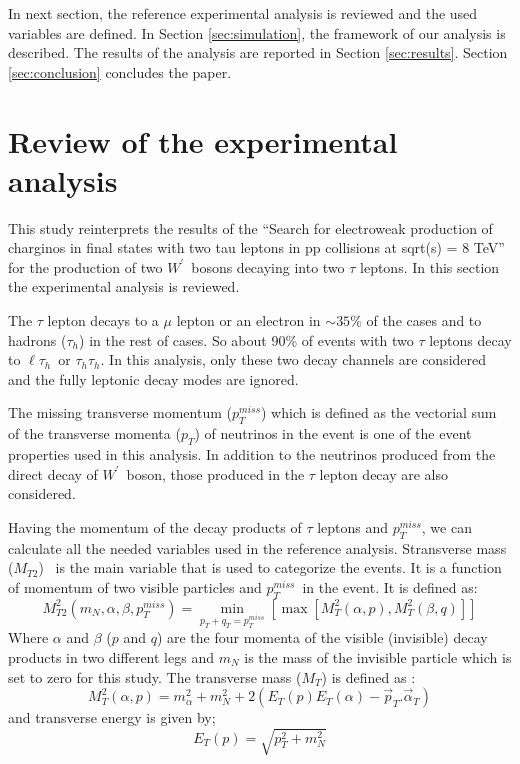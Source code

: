 \documentclass[preprint,showpacs,preprintnumbers]{revtex4}
\newcommand{\wprime}{\ensuremath{W^\prime}~}
\newcommand{\Tau}{\ensuremath{\tau_h}}
\newcommand{\tauTau}{\ensuremath{\tau_h\tau_h}}
\newcommand{\lepTau}{\ensuremath{\ell\tau_h}}
\newcommand{\pt}{\ensuremath{p_T}}
\newcommand{\MET}{\ensuremath{p_T^{miss}}}
\begin{document}
In next section, the reference experimental analysis is reviewed and the used variables are defined. In Section \ref{sec:simulation}, the framework of our analysis is described. The results of the analysis are reported in Section \ref{sec:results}. Section \ref{sec:conclusion} concludes the paper.

\section{Review of the experimental analysis}
This study reinterprets the results of the ``Search for electroweak production of charginos in final states with two tau leptons in pp collisions at sqrt(s) = 8 TeV''\cite{Khachatryan:2016trj} for the production of two \wprime bosons decaying into two $\tau$ leptons. In this section the experimental analysis is reviewed.

The $\tau$ lepton decays  to a $\mu$ lepton or an electron in $\sim 35\%$ of the cases and to hadrons (\Tau) in the rest of cases. So about 90\% of events with two $\tau$ leptons decay to \lepTau ~or \tauTau. In this analysis, only these two decay channels are considered and the fully leptonic decay modes are ignored. 

The missing transverse momentum (\MET) which is  defined as the vectorial sum of the transverse momenta (\pt) of neutrinos in the event is one of the event properties used in this analysis. In addition to the neutrinos  produced from the direct decay of \wprime boson, those produced in the $\tau$ lepton decay are also considered.

Having the momentum of the decay products of $\tau$ leptons and \MET, we can calculate all the needed variables used in the reference analysis. Stransverse mass ($M_{T2}$)~\cite{Lester:1999tx,Barr:2003rg}  is the main variable that is used to categorize the events. It is a function of momentum of two visible particles and \MET ~in the event. It is defined as:
\begin{equation}
M^2_{T2}(m_{N},\alpha,\beta,\MET) = \displaystyle\min_{p_T+q_T=\MET} [\max[M^2_{T}(\alpha,p),M^2_{T}(\beta,q)]]
\end{equation}
Where $\alpha$ and $\beta$ ($p$ and $q$) are the four momenta of the visible (invisible) decay products in two different legs and  $m_N$ is the mass of the invisible particle which is set to zero for this study. The transverse mass ($M_{T}$) is defined as :
\begin{equation}
M^2_{T}(\alpha,p) =  m^2_{\alpha}+m^2_N+2(E_T(p)E_T(\alpha)-\vec{p}_T.\vec{\alpha}_T)
\end{equation}
and transverse energy is given by; 
\begin{equation}
E_T(p)=\sqrt{p^2_T+m^2_N}
\end{equation}
\end{document}
